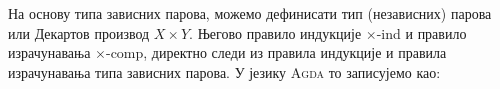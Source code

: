 На основу типа зависних парова, можемо дефинисати тип (независних) парова или Декартов производ $X \times Y$. Његово правило индукције $\times$-ind и правило израчунавања $\times$-comp, директно следи из правила индукције и правила израчунавања типа зависних парова. У језику \textsc{Agda} то записујемо као:
\begin{code}%
\>[0]\AgdaSpace{}%
\AgdaSymbol{:}\AgdaSpace{}%
\AgdaSpace{}%
\AgdaSpace{}%
\AgdaSpace{}%
\AgdaSpace{}%
\AgdaSpace{}%
\AgdaSpace{}%
\AgdaSpace{}%
\AgdaSpace{}%
\AgdaSpace{}%
\<%
\\
\>[0]\AgdaSpace{}%
\AgdaSpace{}%
\AgdaSpace{}%
\AgdaSymbol{=}\AgdaSpace{}%
\AgdaSpace{}%
\AgdaSpace{}%
\AgdaSpace{}%
\AgdaSpace{}%
\AgdaFunction{,}\AgdaSpace{}%
\<%
\\
%
\\[\AgdaEmptyExtraSkip]%
\>[0]%
\>[929I]\AgdaSymbol{:}\AgdaSpace{}%
\AgdaSymbol{\{}\AgdaSpace{}%
\AgdaSymbol{:}\AgdaSpace{}%
\AgdaSpace{}%
\AgdaSpace{}%
\AgdaSymbol{\}}\AgdaSpace{}%
\AgdaSymbol{\{}\AgdaSpace{}%
\AgdaSymbol{:}\AgdaSpace{}%
\AgdaSpace{}%
\AgdaSpace{}%
\AgdaSymbol{\}}\AgdaSpace{}%
\AgdaSymbol{\{}\AgdaSpace{}%
\AgdaSymbol{:}\AgdaSpace{}%
\AgdaSpace{}%
\AgdaSpace{}%
\AgdaSpace{}%
\AgdaSpace{}%
\AgdaSpace{}%
\AgdaSpace{}%
\AgdaSymbol{\}}\<%
\\
\>[.][@{}l@{}]\<[929I]%
\>[12]\AgdaSpace{}%
\AgdaSymbol{((}\AgdaSpace{}%
\AgdaSymbol{:}\AgdaSpace{}%
\AgdaSymbol{)}\AgdaSpace{}%
\AgdaSymbol{(}\AgdaSpace{}%
\AgdaSymbol{:}\AgdaSpace{}%
\AgdaSymbol{)}\AgdaSpace{}%
\AgdaSpace{}%
\AgdaSpace{}%
\AgdaSymbol{(}\AgdaSpace{}%
\AgdaOperator{\AgdaInductiveConstructor{,}}\AgdaSpace{}%
\AgdaSymbol{))}\<%
\\
%
\>[12]\AgdaSpace{}%
\AgdaSymbol{(}\AgdaBound{(}\AgdaSpace{}%

\end{code}
